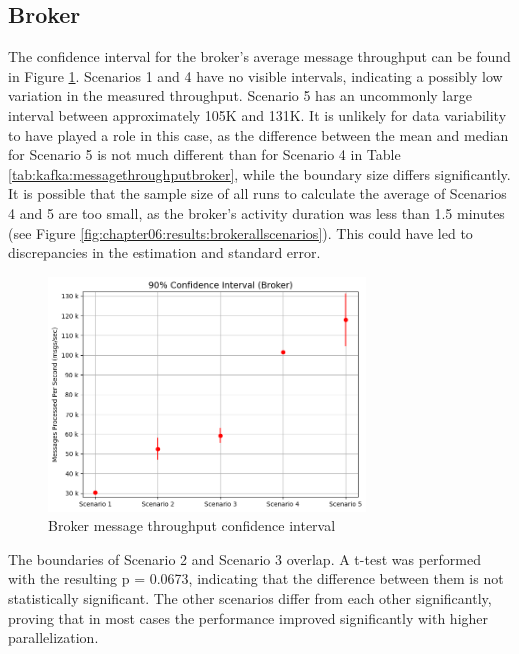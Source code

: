 \subsection{Broker}
The confidence interval for the broker's average message throughput can be found in Figure \ref{fig:chapter07:discussion:brokermessageci}. Scenarios 1 and 4 have no visible intervals, indicating a possibly low variation in the measured throughput. Scenario 5 has an uncommonly large interval between approximately 105K and 131K. It is unlikely for data variability to have played a role in this case, as the difference between the mean and median for Scenario 5 is not much different than for Scenario 4 in Table \ref{tab:kafka:messagethroughputbroker}, while the boundary size differs significantly. It is possible that the sample size of all runs to calculate the average of Scenarios 4 and 5 are too small, as the broker's activity duration was less than 1.5 minutes (see Figure \ref{fig:chapter06:results:brokerallscenarios}). This could have led to discrepancies in the estimation and standard error.

\begin{figure}[htbp]
    \centering
    \includegraphics[width=0.75\textwidth]{chapters/images/confidence-intervals/broker-message-ci.png}
    \caption{Broker message throughput confidence interval}
    \label{fig:chapter07:discussion:brokermessageci}
\end{figure}

The boundaries of Scenario 2 and Scenario 3 overlap. A t-test was performed with the resulting p = 0.0673, indicating that the difference between them is not statistically significant. The other scenarios differ from each other significantly, proving that in most cases the performance improved significantly with higher parallelization.

